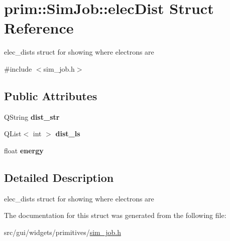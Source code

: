 \hypertarget{structprim_1_1SimJob_1_1elecDist}{}\section{prim\+:\+:Sim\+Job\+:\+:elec\+Dist Struct Reference}
\label{structprim_1_1SimJob_1_1elecDist}


elec\+\_\+dists struct for showing where electrons are  




{\ttfamily \#include $<$sim\+\_\+job.\+h$>$}

\subsection*{Public Attributes}
\begin{DoxyCompactItemize}
\item 
Q\+String {\bfseries dist\+\_\+str}\hypertarget{structprim_1_1SimJob_1_1elecDist_af4b0d9de4752f19b6f01887d64ef4107}{}\label{structprim_1_1SimJob_1_1elecDist_af4b0d9de4752f19b6f01887d64ef4107}

\item 
Q\+List$<$ int $>$ {\bfseries dist\+\_\+ls}\hypertarget{structprim_1_1SimJob_1_1elecDist_a4f37103a0e94ef31622f9978a7c8765f}{}\label{structprim_1_1SimJob_1_1elecDist_a4f37103a0e94ef31622f9978a7c8765f}

\item 
float {\bfseries energy}\hypertarget{structprim_1_1SimJob_1_1elecDist_af735f97907807b1f3283183f5637f9aa}{}\label{structprim_1_1SimJob_1_1elecDist_af735f97907807b1f3283183f5637f9aa}

\end{DoxyCompactItemize}


\subsection{Detailed Description}
elec\+\_\+dists struct for showing where electrons are 

The documentation for this struct was generated from the following file\+:\begin{DoxyCompactItemize}
\item 
src/gui/widgets/primitives/\hyperlink{sim__job_8h}{sim\+\_\+job.\+h}\end{DoxyCompactItemize}
